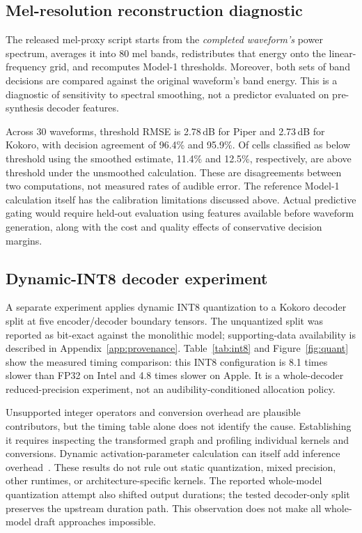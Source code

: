 \documentclass[11pt,a4paper]{article}
\begin{document}
\subsection{Mel-resolution reconstruction diagnostic}
\label{sec:rq3}
The released mel-proxy script starts from the \emph{completed waveform's} power spectrum, averages it into 80 mel bands, redistributes that energy onto the linear-frequency grid, and recomputes Model-1 thresholds. Moreover, both sets of band decisions are compared against the original waveform's band energy. This is a diagnostic of sensitivity to spectral smoothing, not a predictor evaluated on pre-synthesis decoder features.

Across 30 waveforms, threshold RMSE is 2.78\,dB for Piper and 2.73\,dB for Kokoro, with decision agreement of 96.4\% and 95.9\%. Of cells classified as below threshold using the smoothed estimate, 11.4\% and 12.5\%, respectively, are above threshold under the unsmoothed calculation. These are disagreements between two computations, not measured rates of audible error. The reference Model-1 calculation itself has the calibration limitations discussed above. Actual predictive gating would require held-out evaluation using features available before waveform generation, along with the cost and quality effects of conservative decision margins.

\subsection{Dynamic-INT8 decoder experiment}
\label{sec:rq4}
A separate experiment applies dynamic INT8 quantization to a Kokoro decoder split at five encoder/decoder boundary tensors. The unquantized split was reported as bit-exact against the monolithic model; supporting-data availability is described in Appendix~\ref{app:provenance}. Table~\ref{tab:int8} and Figure~\ref{fig:quant} show the measured timing comparison: this INT8 configuration is 8.1 times slower than FP32 on Intel and 4.8 times slower on Apple. It is a whole-decoder reduced-precision experiment, not an audibility-conditioned allocation policy.

Unsupported integer operators and conversion overhead are plausible contributors, but the timing table alone does not identify the cause. Establishing it requires inspecting the transformed graph and profiling individual kernels and conversions. Dynamic activation-parameter calculation can itself add inference overhead~\cite{ortquantization}. These results do not rule out static quantization, mixed precision, other runtimes, or architecture-specific kernels. The reported whole-model quantization attempt also shifted output durations; the tested decoder-only split preserves the upstream duration path. This observation does not make all whole-model draft approaches impossible.
\end{document}
